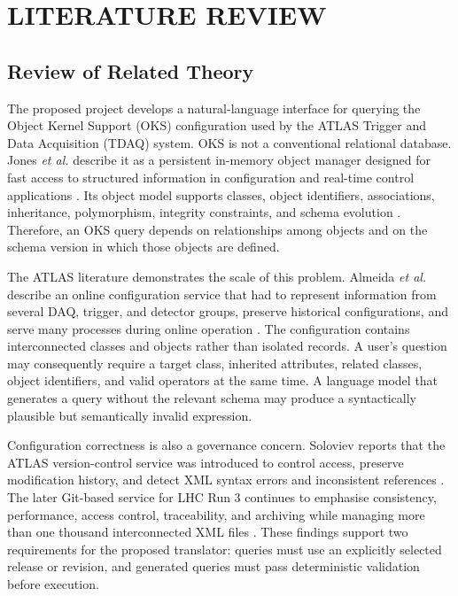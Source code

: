 \documentclass[12pt, a4paper]{report}
\begin{document}
\chapter{LITERATURE REVIEW}

\section{Review of Related Theory}
The proposed project develops a natural-language interface for querying the
Object Kernel Support (OKS) configuration used by the ATLAS Trigger and Data
Acquisition (TDAQ) system. OKS is not a conventional relational database.
Jones \textit{et al.} describe it as a persistent in-memory object manager
designed for fast access to structured information in configuration and
real-time control applications \cite{oks_paper}. Its object model supports
classes, object identifiers, associations, inheritance, polymorphism,
integrity constraints, and schema evolution \cite{oks_paper}. Therefore, an
OKS query depends on relationships among objects and on the schema version in
which those objects are defined.

The ATLAS literature demonstrates the scale of this problem. Almeida
\textit{et al.} describe an online configuration service that had to represent
information from several DAQ, trigger, and detector groups, preserve
historical configurations, and serve many processes during online operation
\cite{alexandrov2007}. The configuration contains interconnected classes and
objects rather than isolated records. A user's question may consequently
require a target class, inherited attributes, related classes, object
identifiers, and valid operators at the same time. A language model that
generates a query without the relevant schema may produce a syntactically
plausible but semantically invalid expression.

Configuration correctness is also a governance concern. Soloviev reports that
the ATLAS version-control service was introduced to control access, preserve
modification history, and detect XML syntax errors and inconsistent references
\cite{soloviev_vcs}. The later Git-based service for LHC Run 3 continues to
emphasise consistency, performance, access control, traceability, and
archiving while managing more than one thousand interconnected XML files
\cite{atlas_git}. These findings support two requirements for the proposed
translator: queries must use an explicitly selected release or revision, and
generated queries must pass deterministic validation before execution.
\end{document}
